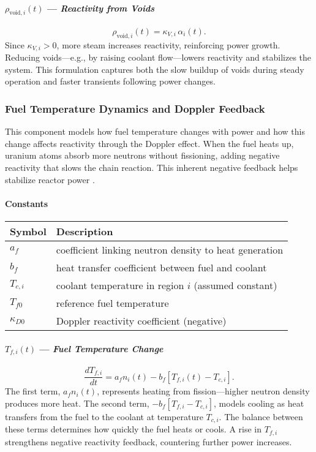 \documentclass[11pt]{article}
\begin{document}
\paragraph{\textbf{$\rho_{\mathrm{void},i}(t)$ --- \textit{Reactivity from Voids}}}
\begin{equation}
\rho_{\mathrm{void},i}(t) = \kappa_{V,i}\,\alpha_i(t).
\end{equation}
Since $\kappa_{V,i} > 0$, more steam increases reactivity, reinforcing power growth. Reducing voids—e.g., by raising coolant flow—lowers reactivity and stabilizes the system. This formulation captures both the slow buildup of voids during steady operation and faster transients following power changes.

\subsubsection{Fuel Temperature Dynamics and Doppler Feedback}
This component models how fuel temperature changes with power and how this change affects reactivity through the Doppler effect. When the fuel heats up, uranium atoms absorb more neutrons without fissioning, adding negative reactivity that slows the chain reaction. This inherent negative feedback helps stabilize reactor power \cite{Duderstadt1976,Lewis2008,NP_Doppler}.

\paragraph{\textbf{Constants}}
\begin{center}
\begin{tabular}{@{}ll@{}}
\toprule
\textbf{Symbol} & \textbf{Description} \\
\midrule
$a_f$ & coefficient linking neutron density to heat generation \\
$b_f$ & heat transfer coefficient between fuel and coolant \\
$T_{c,i}$ & coolant temperature in region $i$ (assumed constant) \\
$T_{f0}$ & reference fuel temperature \\
$\kappa_{D0}$ & Doppler reactivity coefficient (negative) \\
\bottomrule
\end{tabular}
\end{center}

\paragraph{\textbf{$T_{f,i}(t)$ --- \textit{Fuel Temperature Change}}}
\begin{equation}
\frac{dT_{f,i}}{dt} = a_f n_i(t) - b_f[T_{f,i}(t) - T_{c,i}].
\end{equation}
The first term, $a_f n_i(t)$, represents heating from fission---higher neutron density produces more heat. The second term, $-b_f[T_{f,i} - T_{c,i}]$, models cooling as heat transfers from the fuel to the coolant at temperature $T_{c,i}$. The balance between these terms determines how quickly the fuel heats or cools. A rise in $T_{f,i}$ strengthens negative reactivity feedback, countering further power increases.
\end{document}
